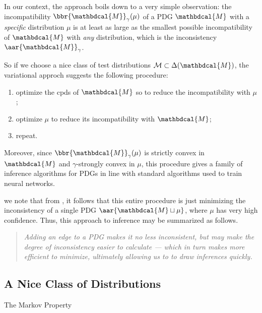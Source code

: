 \documentclass{article}
\theoremstyle{plain}
\theoremstyle{definition}
\theoremstyle{remark}
\newcommand{\dg}[1]{\mathbdcal{#1}}
\newcommand{\bundle}{\mathbin{\sqcup}}
\begin{document}
In our context, the approach boils down to a very simple observation: the incompatibility $\bbr{\dg M}_\gamma(\mu)$ of a PDG $\dg M$ with a \emph{specific} distribution $\mu$ is at least as large as the smallest possible incompatibility of $\dg M$ with \emph{any} distribution, which is the inconsistency $\aar{\dg M}_\gamma$.

So if we choose a nice class of test distributions $\mathcal M \subset \Delta(\dg M)$, the variational approch suggests the following procedure:
\begin{center}
	\begin{enumerate}[nosep]
		\item optimize the cpds of $\dg M$ so to reduce the incompatibility with $\mu$;
		\item optimize $\mu$ to reduce its incompatibility with $\dg M$;
		\item repeat.
	\end{enumerate}
\end{center}

Moreover, since $\bbr{\dg M}_\gamma(\mu)$ is strictly convex in $\dg M$ and $\gamma$-strongly convex in $\mu$, this procedure gives a family of inference algorithms for PDGs in line with standard algorithms used to train neural networks.

 we note that from , it follows that this entire procedure is just minimizing the inconsistency of a single PDG $\aar{\dg M \bundle \mu}$, where $\mu$ has very high confidence.
Thus, this approach to inference may be summarized as follows.

\begin{quotation} \it
	\noindent Adding an edge to a PDG makes it no less inconsistent, but may make the degree of inconsistency easier to calculate --- which in turn makes more efficient to minimize, ultimately allowing us to to draw inferences quickly.
\end{quotation}


\subsection{A Nice Class of Distributions}

The Markov Property
\end{document}

